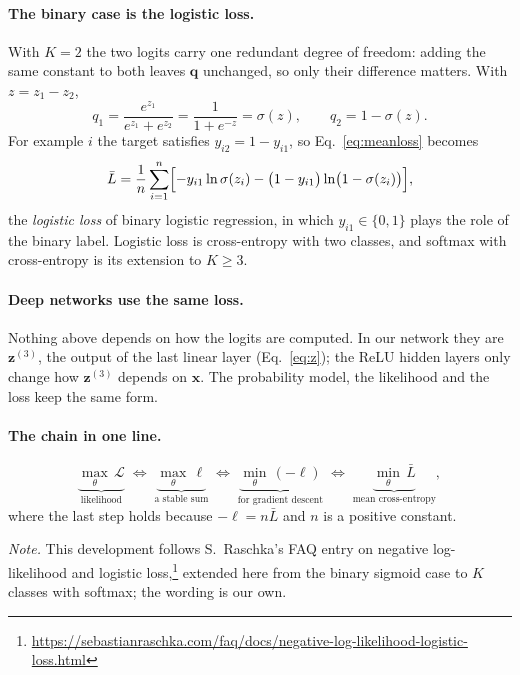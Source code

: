 \documentclass[12pt]{article}
\numberwithin{equation}{section} %
\newcommand{\vc}[1]{\symbf{#1}}
\begin{document}
\paragraph{The binary case is the logistic loss.}
With $K=2$ the two logits carry one redundant degree of freedom: adding the same
constant to both leaves $\vc{q}$ unchanged, so only their difference matters.
With $z=z_1-z_2$,
\[
  q_1=\frac{e^{z_1}}{e^{z_1}+e^{z_2}}=\frac{1}{1+e^{-z}}=\sigma(z),
  \qquad q_2=1-\sigma(z).
\]
For example $i$ the target satisfies $y_{i2}=1-y_{i1}$, so
Eq.~\eqref{eq:meanloss} becomes
\begin{equation}\label{eq:logistic}
  \bar L=\frac{1}{n}\sum_{i=1}^{n}\Bigl[-y_{i1}\ln\sigma(z_i)
    -\bigl(1-y_{i1}\bigr)\ln\bigl(1-\sigma(z_i)\bigr)\Bigr],
\end{equation}
the \emph{logistic loss} of binary logistic regression, in which $y_{i1}\in\{0,1\}$
plays the role of the binary label. Logistic loss is cross-entropy with two
classes, and softmax with cross-entropy is its extension to $K\ge3$.

\paragraph{Deep networks use the same loss.}
Nothing above depends on how the logits are computed. In our network they are
$\vc{z}^{(3)}$, the output of the last linear layer (Eq.~\eqref{eq:z}); the ReLU
hidden layers only change how $\vc{z}^{(3)}$ depends on $\vc{x}$. The probability
model, the likelihood and the loss keep the same form.

\paragraph{The chain in one line.}
\begin{equation}\label{eq:chain}
  \underbrace{\max_{\theta}\,\mathcal{L}}_{\text{likelihood}}
  \;\Longleftrightarrow\;
  \underbrace{\max_{\theta}\,\ell}_{\text{a stable sum}}
  \;\Longleftrightarrow\;
  \underbrace{\min_{\theta}\,(-\ell)}_{\text{for gradient descent}}
  \;\Longleftrightarrow\;
  \underbrace{\min_{\theta}\,\bar L}_{\text{mean cross-entropy}},
\end{equation}
where the last step holds because $-\ell=n\bar L$ and $n$ is a positive constant.

\medskip
\noindent\emph{Note.} This development follows S.~Raschka's FAQ entry on negative
log-likelihood and logistic
loss,\footnote{\url{https://sebastianraschka.com/faq/docs/negative-log-likelihood-logistic-loss.html}}
extended here from the binary sigmoid case to $K$ classes with softmax; the
wording is our own.
\end{document}
